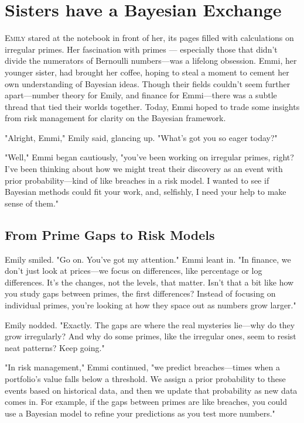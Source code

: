 \section*{Sisters have a Bayesian Exchange}

\lettrine{E}{mily} stared at the notebook in front of her, its pages filled with calculations on irregular primes. Her fascination with primes — especially those that didn’t divide the numerators of Bernoulli numbers—was a lifelong obsession. Emmi, her younger sister, had brought her coffee, hoping to steal a moment to cement her own understanding of Bayesian ideas. Though their fields couldn’t seem further apart—number theory for Emily, and finance for Emmi—there was a subtle thread that tied their worlds together. Today, Emmi hoped to trade some insights from risk management for clarity on the Bayesian framework.

"Alright, Emmi," Emily said, glancing up. "What’s got you so eager today?"

"Well," Emmi began cautiously, "you’ve been working on irregular primes, right? I’ve been thinking about how we might treat their discovery as an event with prior probability—kind of like breaches in a risk model. I wanted to see if Bayesian methods could fit your work, and, selfishly, I need your help to make sense of them."

\subsection*{From Prime Gaps to Risk Models}


Emily smiled. "Go on. You’ve got my attention."
Emmi leant in. "In finance, we don’t just look at prices—we focus on differences, like percentage or log differences. It’s the changes, not the levels, that matter. Isn’t that a bit like how you study gaps between primes, the first differences? Instead of focusing on individual primes, you’re looking at how they space out as numbers grow larger."

Emily nodded. "Exactly. The gaps are where the real mysteries lie—why do they grow irregularly? And why do some primes, like the irregular ones, seem to resist neat patterns? Keep going."

"In risk management," Emmi continued, "we predict breaches—times when a portfolio’s value falls below a threshold. We assign a prior probability to these events based on historical data, and then we update that probability as new data comes in. For example, if the gaps between primes are like breaches, you could use a Bayesian model to refine your predictions as you test more numbers."

